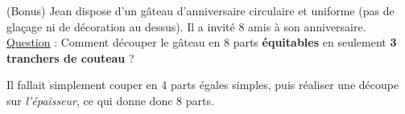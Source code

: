 \documentclass[12pt,
addpoints,
fleqn
]{exam}
\begin{document}
\begin{questions}
\begin{solution}
\begin{parts}
\end{parts}

\end{solution}


\question (Bonus) Jean dispose d'un gâteau d'anniversaire circulaire et uniforme (pas de glaçage ni de décoration au dessus). Il a invité 8 amis à son anniversaire. \\
\underline{Question} : Comment découper le gâteau en 8 parts \textbf{équitables} en seulement \textbf{3 tranchers de couteau} ? 

\begin{solution}
Il fallait simplement couper en 4 parts égales simples, puis réaliser une découpe sur \emph{l'épaisseur}, ce qui donne donc 8 parts.
\end{solution}

\end{questions}
\end{document}
